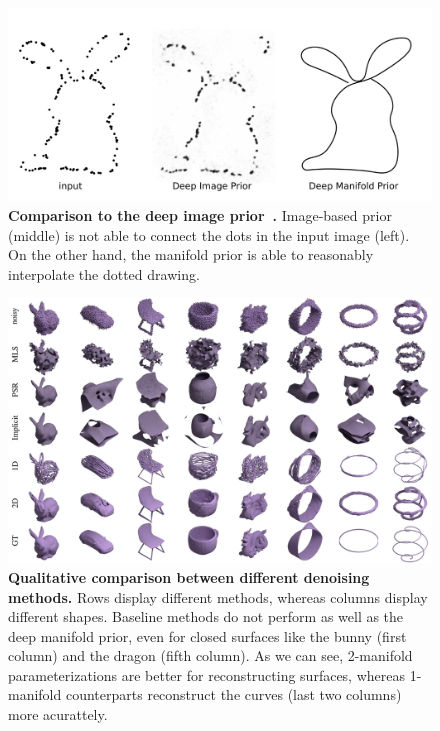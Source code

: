 \begin{figure}[t!]
\centering
\includegraphics[width=0.8\linewidth]{dmp/imgs/dipcomp.pdf}
	\caption{\label{fig:dipcomp} \small
	\textbf{Comparison to the deep image prior~\cite{dip}.}
	Image-based prior (middle) is not able to connect the dots in the input image (left).
	On the other hand, the manifold prior is able to reasonably interpolate the dotted
	drawing.
	}
	\vspace{-18pt}
\end{figure}


\begin{figure}[t]
\centering
\includegraphics[width=1.0\linewidth]{dmp/imgs/denoising.pdf}
	\caption{\label{fig:denoising} \small
	\textbf{Qualitative comparison between different denoising methods.}
	Rows display different methods, whereas columns display different shapes.
	Baseline methods do not perform as well as the deep manifold prior, even for closed surfaces like the bunny (first column) and the dragon (fifth column).
	As we can see, 2-manifold parameterizations are better for reconstructing surfaces, whereas 1-manifold counterparts reconstruct the curves (last two columns) more
	acurattely.
	\small}
\end{figure}

